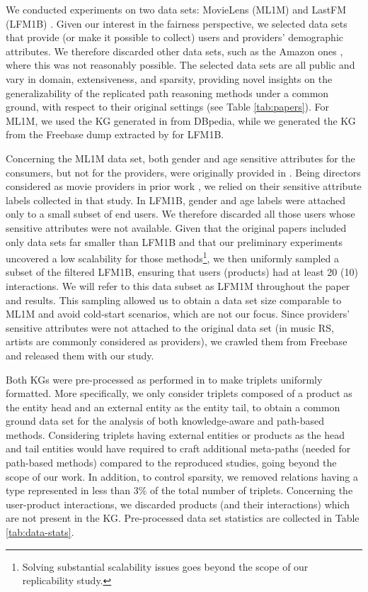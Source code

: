 \documentclass[runningheads]{llncs}
\begin{document}
We conducted experiments on two data sets: MovieLens (ML1M) \cite{ml1m} and LastFM (LFM1B) \cite{lastfm-dataset}. 
Given our interest in the fairness perspective, we selected data sets that provide (or make it possible to collect) users and providers' demographic attributes.
We therefore discarded other data sets, such as the Amazon ones \cite{amazon_dataset}, where this was not reasonably possible. 
The selected data sets are all public and vary in domain, extensiveness, and sparsity, providing novel insights on the generalizability of the replicated path reasoning methods under a common ground, with respect to their original settings (see Table \ref{tab:papers}).
For ML1M, we used the KG generated in \cite{ktup} from DBpedia, while we generated the KG from the Freebase dump extracted by \cite{kb4rec} for LFM1B. 

Concerning the ML1M data set, both gender and age sensitive attributes for the consumers, but not for the providers, were originally provided in \cite{ml1m}.
Being directors considered as movie providers in prior work \cite{DBLP:journals/umuai/BorattoFM21}, we relied on their sensitive attribute labels collected in that study.
In LFM1B, gender and age labels were attached only to a small subset of end users. 
We therefore discarded all those users whose sensitive attributes were not available. 
Given that the original papers included only data sets far smaller than LFM1B and that our preliminary experiments uncovered a low scalability for those methods\footnote{
Solving substantial scalability issues goes beyond the scope of our replicability study.}, 
we then uniformly sampled a subset of the filtered LFM1B, ensuring that users (products) had at least 20 (10) interactions. {\color{black}We will refer to this data subset as LFM1M throughout the paper and results.}
This sampling allowed us to obtain a data set size comparable to ML1M and avoid cold-start scenarios, which are not our focus.
Since providers' sensitive attributes were not attached to the original data set (in music RS, artists are commonly considered as providers), we crawled them from Freebase and released them with our study.  

Both KGs were pre-processed as performed in \cite{10.1145/3523227.3547374} to make triplets uniformly formatted. 
{\color{black}More specifically, we only consider triplets composed of a product as the entity head and an external entity as the entity tail, to obtain a common ground data set for the analysis of both knowledge-aware and path-based methods.  Considering triplets having external entities or products as the head and tail entities would have required to craft additional meta-paths (needed for path-based methods) compared to the reproduced studies, going beyond the scope of our work. In addition, to control sparsity, we removed relations having a type represented in less than 3\% of the total number of triplets}.
Concerning the user-product interactions, we discarded products (and their interactions) which are not present in the KG. 
Pre-processed data set statistics are collected in Table \ref{tab:data-stats}. 
\end{document}
